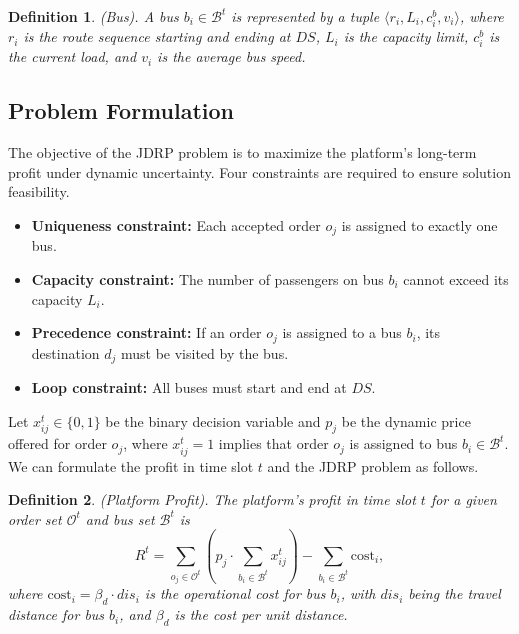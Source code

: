 \documentclass[lettersize,journal]{IEEEtran}
\newtheorem{definition}{Definition}
\begin{document}
\color{black}
\begin{definition}
(Bus).
A bus $b_i \in \mathcal{B}^t$ is represented by a tuple $\langle r_i, L_i, c^b_i, v_i \rangle$, where $r_i$ is the route sequence starting and ending at $DS$, $L_i$ is the capacity limit, $c^b_i$ is the current load, and $v_i$ is the average bus speed.
\end{definition}

\subsection{Problem Formulation}
\label{sec:formulate}

The objective of the JDRP problem is to maximize the platform's long-term profit under dynamic uncertainty. Four constraints are required to ensure solution feasibility.

\begin{itemize}
    \item \textbf{Uniqueness constraint:} Each accepted order $o_j$ is assigned to exactly one bus.
    \item \textbf{Capacity constraint:} The number of passengers on bus $b_i$ cannot exceed its capacity $L_i$.
    \item \textbf{Precedence constraint:} If an order $o_j$ is assigned to a bus $b_i$, its destination $d_j$ must be visited by the bus. 
    \item \textbf{Loop constraint:} All buses must start and end at $DS$.
\end{itemize}

\color{blue}

Let $x_{ij}^t \in \{0, 1\}$ be the binary decision variable and $p_j$ be the dynamic price offered for order $o_j$, where $x_{ij}^t=1$ implies that order $o_j$ is assigned to bus $b_i \in \mathcal{B}^t$. We can formulate the profit in time slot $t$ and the JDRP problem as follows.

\begin{definition}
    (Platform Profit). The platform's profit in time slot $t$ for a given order set $\mathcal{O}^t$ and bus set $\mathcal{B}^t$ is
    \begin{equation}
        R^t = \sum_{o_j \in \mathcal{O}^t} \left( p_j \cdot \sum_{b_i \in \mathcal{B}^t} x_{ij}^t \right) - \sum_{b_i \in \mathcal{B}^t} \text{cost}_i,\label{eq:profit}
    \end{equation}
    where $\text{cost}_i = \beta_d \cdot dis_i$ is the operational cost for bus $b_i$, with $dis_i$ being the travel distance for bus $b_i$, and $\beta_d$ is the cost per unit distance.
\end{definition}
\end{document}
